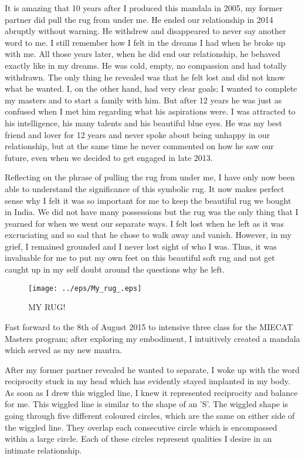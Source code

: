 It is amazing that 10 years after I produced this mandala in 2005, my former partner did pull the rug from under me. He ended our relationship in 2014 abruptly without warning. He withdrew and disappeared to never say another word to me. I still remember how I felt in the dreams I had when he broke up with me. All those years later, when he did end our relationship, he behaved exactly like in my dreams. He was cold, empty, no compassion and had totally withdrawn. The only thing he revealed was that he felt lost and did not know what he wanted. I, on the other hand, had very clear goals; I wanted to complete my masters and to start a family with him. But after 12 years he was just as confused when I met him regarding what his aspirations were. I was attracted to his intelligence, his many talents and his beautiful blue eyes. He was my best friend and lover for 12 years and never spoke about being unhappy in our relationship, but at the same time he never commented on how he saw our future, even when we decided to get engaged in late 2013. 

Reflecting on the phrase of pulling the rug from under me, I have only now been able to understand the significance of this symbolic rug. It now makes perfect sense why I felt it was so important for me to keep the beautiful rug we bought in India. We did not have many possessions but the rug was the only thing that I yearned for when we went our separate ways. I felt lost when he left as it was excruciating and so sad that he chose to walk away and vanish. However, in my grief, I remained grounded and I never lost sight of who I was. Thus, it was invaluable for me to put my own feet on this beautiful soft rug and not get caught up in my self doubt around the questions why he left.


\begin{figure}[htbp]
\begin{center}
\texttt{[image: ../eps/My\_rug\_.eps]}
\caption{MY RUG!}
\label{label}
\end{center}
\end{figure}


Fast forward to the 8th of August 2015 to intensive three class for the MIECAT Masters program; after exploring my embodiment, I intuitively created a mandala which served as my new mantra. 




After my former partner revealed he wanted to separate, I woke up with the word reciprocity stuck in my head which has evidently stayed implanted in my body. As soon as I drew this wiggled line, I knew it represented reciprocity and balance for me. This wiggled line is similar to the shape of an 'S'. The wiggled shape is going through five different coloured circles, which are the same on either side of the wiggled line. They overlap each consecutive circle which is encompassed within a large circle. Each of these circles represent qualities I desire in an intimate relationship. 

